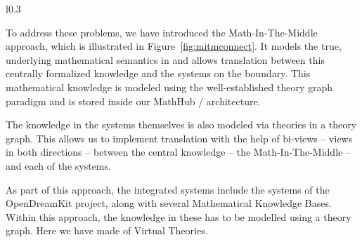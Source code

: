 \begin{wrapfigure}{l}{0.3\textwidth}
  \begin{center}
  \end{center}

  \caption[The MITM Approach to Connecting Systems]{
    The MiTM Approach to Connecting Systems. 
  }
  \label{fig:mitmconnect}
\end{wrapfigure}
To address these problems, we have introduced the Math-In-The-Middle approach, which is illustrated in Figure~\ref{fig:mitmconnect}. 
It models the true, underlying mathematical semantics in \mmt and allows translation between this centrally formalized knowledge and the systems on the boundary.
This mathematical knowledge is modeled using the well-established theory graph paradigm and is stored inside our MathHub / \mmt architecture. 

The knowledge in the systems themselves is also modeled via theories in a theory graph.
This allows us to implement translation with the help of bi-views -- views in both directions -- between the central knowledge -- the Math-In-The-Middle -- and each of the systems. 

As part of this approach, the integrated systems include the systems of the OpenDreamKit project, along with several Mathematical Knowledge Bases. 
Within this approach, the knowledge in these has to be modelled using a theory graph. 
Here we have made of Virtual Theories. 

